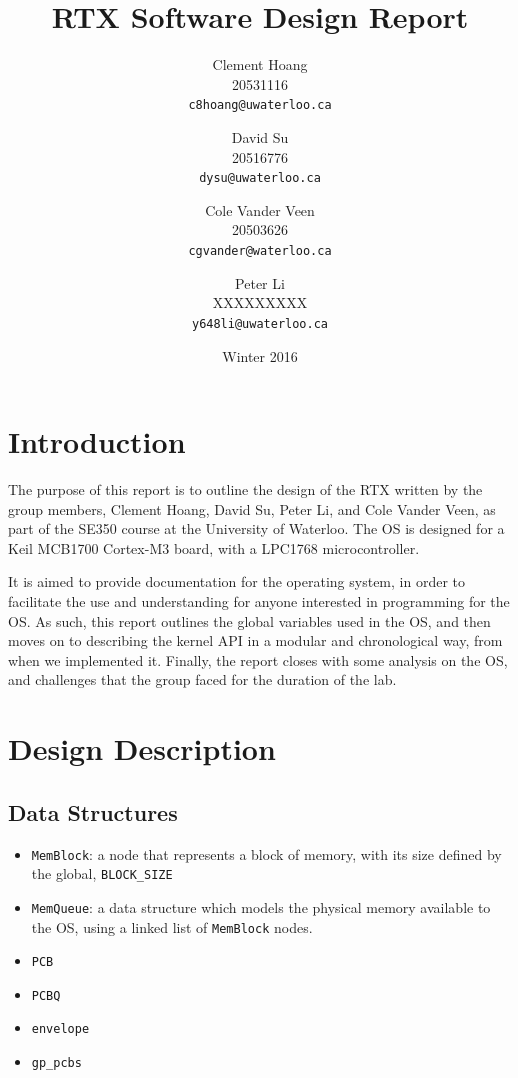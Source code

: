 \documentclass[12pt]{report}
\begin{document}
\title{RTX Software Design Report}

\author{
    Clement Hoang\\
		20531116\\
    \texttt{c8hoang@uwaterloo.ca}
    \and
    David Su\\
		20516776\\
    \texttt{dysu@uwaterloo.ca}
    \and
    Cole Vander Veen\\
		20503626\\
    \texttt{cgvander@waterloo.ca}
    \and
    Peter Li\\
		XXXXXXXXX\\
    \texttt{y648li@uwaterloo.ca}
}

\date{Winter 2016}

\maketitle


\tableofcontents
\listofalgorithms
\listoffigures

\chapter{Introduction}

The purpose of this report is to outline the design of the RTX written by the group members, Clement Hoang, David Su, Peter Li, and Cole Vander Veen, as part of the SE350 course at the University of Waterloo. The OS is designed for a Keil MCB1700 Cortex-M3 board, with a LPC1768 microcontroller.

It is aimed to provide documentation for the operating system, in order to facilitate the use and understanding for anyone interested in programming for the OS. As such, this report outlines the global variables used in the OS, and then moves on to describing the kernel API in a modular and chronological way, from when we implemented it. Finally, the report closes with some analysis on the OS, and challenges that the group faced for the duration of the lab.

\chapter{Design Description}

\section{Data Structures}
\begin{itemize}
  \item \texttt{MemBlock}: a node that represents a block of memory, with its size defined by the global, \texttt{BLOCK_SIZE}
  \item \texttt{MemQueue}: a data structure which models the physical memory available to the OS, using a linked list of \texttt{MemBlock} nodes.

  \item \texttt{PCB}
  \item \texttt{PCBQ}
  \item \texttt{envelope}
  \item \texttt{gp_pcbs}
\end{itemize}
\end{document}
